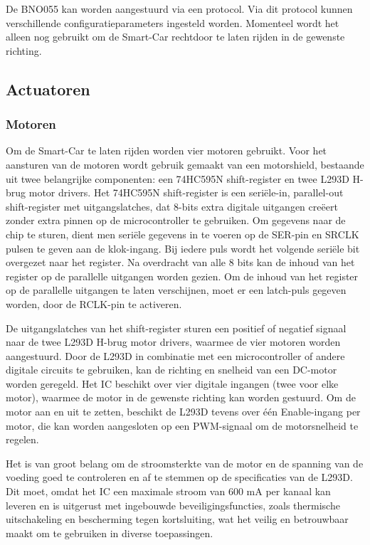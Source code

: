 De BNO055\cite{AXIS} kan worden aangestuurd via een protocol. Via dit protocol kunnen verschillende configuratieparameters ingesteld worden. Momenteel wordt het alleen nog gebruikt om de \gls{Smart-Car} rechtdoor te laten rijden in de gewenste richting. 
\subsection{Actuatoren}
\subsubsection{Motoren}
Om de \gls{Smart-Car} te laten rijden worden vier motoren gebruikt. Voor het aansturen van de motoren wordt gebruik gemaakt van een \gls{motorshield}, bestaande uit twee belangrijke componenten: een 74HC595N\cite{shiftregister} \gls{shift-register} en twee L293D\cite{h-brug} \gls{H-brug} motor drivers. Het 74HC595N\cite{shiftregister} \gls{shift-register} is een seriële-in, parallel-out \gls{shift-register} met uitgangslatches, dat 8-bits extra digitale uitgangen creëert zonder extra pinnen op de \gls{microcontroller} te gebruiken. Om gegevens naar de chip te sturen, dient men seriële gegevens in te voeren op de SER-pin en SRCLK pulsen te geven aan de klok-ingang. Bij iedere puls wordt het volgende seriële bit overgezet naar het \gls{register}. Na overdracht van alle 8 bits kan de inhoud van het \gls{register} op de parallelle uitgangen worden gezien. Om de inhoud van het \gls{register} op de parallelle uitgangen te laten verschijnen, moet er een latch-puls gegeven worden, door de RCLK-pin te activeren.

De uitgangslatches van het \gls{shift-register} sturen een positief of negatief signaal naar de twee L293D\cite{h-brug} \gls{H-brug} motor drivers, waarmee de vier motoren worden aangestuurd. Door de L293D\cite{h-brug} in combinatie met een \gls{microcontroller} of andere digitale circuits te gebruiken, kan de richting en snelheid van een DC-motor worden geregeld. Het IC beschikt over vier digitale ingangen (twee voor elke motor), waarmee de motor in de gewenste richting kan worden gestuurd. Om de motor aan en uit te zetten, beschikt de L293D\cite{h-brug} tevens over één Enable-ingang per motor, die kan worden aangesloten op een \gls{PWM}-signaal om de motorsnelheid te regelen.

Het is van groot belang om de stroomsterkte van de motor en de spanning van de voeding goed te controleren en af te stemmen op de specificaties van de L293D\cite{h-brug}. Dit moet, omdat het IC een maximale stroom van 600 mA per kanaal kan leveren en is uitgerust met ingebouwde beveiligingsfuncties, zoals \gls{thermische} uitschakeling en bescherming tegen kortsluiting, wat het veilig en betrouwbaar maakt om te gebruiken in diverse toepassingen.

